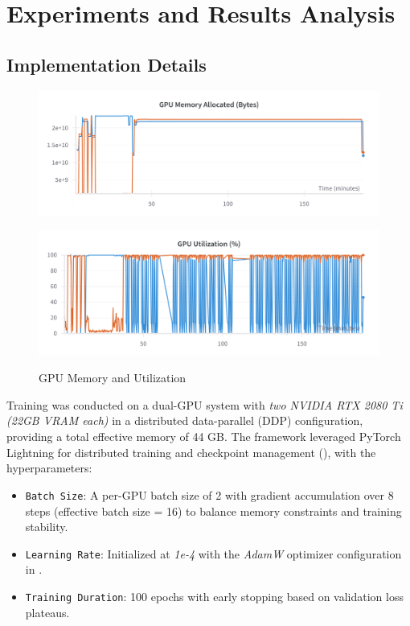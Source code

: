 \section{Experiments and Results Analysis} 
\label{sec:exp-results}

\subsection{Implementation Details}
\label{sec:exp-implementation}

\begin{figure}[htbp]
    \centering
    \begin{minipage}{0.45\textwidth}
        \centering
        \includegraphics[width=\textwidth]{figs/gpu_mem.png}  
        \label{fig:gpu_mem}
    \end{minipage}\hfill
    \begin{minipage}{0.45\textwidth}
        \centering
        \includegraphics[width=\textwidth]{figs/gpu_util.png}  
        \label{fig:gpu_util}
    \end{minipage}
    \caption{GPU Memory and Utilization}
    \label{fig:gpu_mem_util}
\end{figure}

Training was conducted on a dual-GPU system with \textit{two NVIDIA RTX 2080 Ti (22GB VRAM each)}
    in a distributed data-parallel (DDP) configuration, providing a total effective memory of 44 GB.
The framework leveraged PyTorch Lightning for distributed training and checkpoint management
    (), with the hyperparameters:
\begin{itemize}
    \item \texttt{Batch Size}: 
    A per-GPU batch size of 2 with gradient accumulation over 8 steps 
        (effective batch size = 16) to balance memory constraints and training stability.
    \item \texttt{Learning Rate}: 
    Initialized at \textit{1e-4} with the \textit{AdamW} optimizer configuration in .
    \item \texttt{Training Duration}: 
    100 epochs with early stopping based on validation loss plateaus.
\end{itemize}

